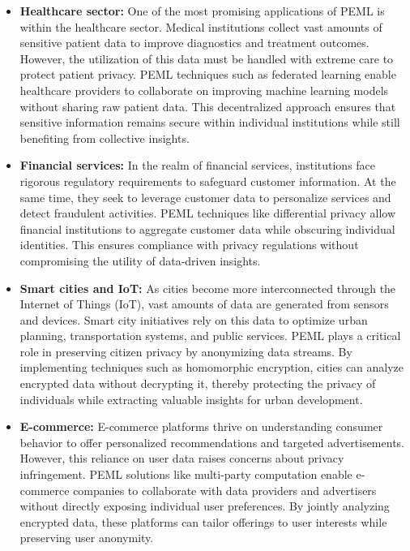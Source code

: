 \begin{itemize}
    \item \textbf{Healthcare sector:} One of the most promising applications of PEML is within the healthcare sector. Medical institutions collect vast amounts of sensitive patient data to improve diagnostics and treatment outcomes. However, the utilization of this data must be handled with extreme care to protect patient privacy. PEML techniques such as federated learning enable healthcare providers to collaborate on improving machine learning models without sharing raw patient data. This decentralized approach ensures that sensitive information remains secure within individual institutions while still benefiting from collective insights.
    \item \textbf{Financial services:} In the realm of financial services, institutions face rigorous regulatory requirements to safeguard customer information. At the same time, they seek to leverage customer data to personalize services and detect fraudulent activities. PEML techniques like differential privacy allow financial institutions to aggregate customer data while obscuring individual identities. This ensures compliance with privacy regulations without compromising the utility of data-driven insights.
    \item \textbf{Smart cities and IoT:} As cities become more interconnected through the Internet of Things (IoT), vast amounts of data are generated from sensors and devices. Smart city initiatives rely on this data to optimize urban planning, transportation systems, and public services. PEML plays a critical role in preserving citizen privacy by anonymizing data streams. By implementing techniques such as homomorphic encryption, cities can analyze encrypted data without decrypting it, thereby protecting the privacy of individuals while extracting valuable insights for urban development.
    \item \textbf{E-commerce:} E-commerce platforms thrive on understanding consumer behavior to offer personalized recommendations and targeted advertisements. However, this reliance on user data raises concerns about privacy infringement. PEML solutions like multi-party computation enable e-commerce companies to collaborate with data providers and advertisers without directly exposing individual user preferences. By jointly analyzing encrypted data, these platforms can tailor offerings to user interests while preserving user anonymity.
\end{itemize}

